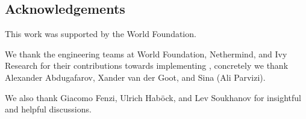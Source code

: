 \iflncs\else %
\subsection{Acknowledgements}



This work was supported by the World Foundation. 

\bigskip

\noindent We thank the engineering teams at World Foundation, Nethermind, and Ivy Research for their contributions towards implementing \ftwoz, concretely we thank Alexander Abdugafarov, Xander van der Goot, and Sina (Ali Parvizi).

We also thank Giacomo Fenzi, Ulrich Haböck, and Lev Soukhanov for insightful and helpful discussions.  

\fi

